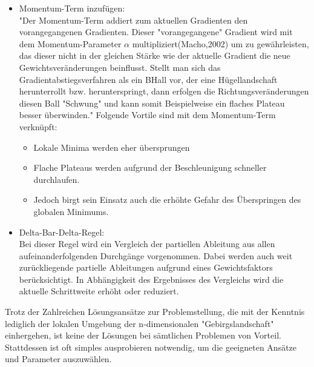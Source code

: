 \begin{itemize}
  \item Momentum-Term inzufügen:\\
  "Der Momentum-Term addiert zum aktuellen Gradienten den vorangegangenen Gradienten. Dieser "vorangegangene" Gradient wird mit dem Momentum-Parameter $\alpha$ multipliziert(Macho,2002) um zu gewährleisten, das dieser nicht
  in der gleichen Stärke wie der aktuelle Gradient die neue Gewichtsveränderungen beinflusst. Stellt man sich das Gradientabstiegsverfahren als ein BHall vor, der eine Hügellandschaft herunterrollt
  bzw. herunterspringt, dann erfolgen die Richtungsveränderungen diesen Ball "Schwung" und kann somit Beispielweise ein flaches Plateau besser überwinden." Folgende Vortile sind mit dem Momentum-Term verknüpft:\\
  \begin{itemize}
  \item Lokale Minima werden eher übersprungen
  \item Flache Plateaus werden aufgrund der Beschleunigung schneller durchlaufen.
  \item Jedoch birgt sein Einsatz auch die erhöhte Gefahr des Überspringen des globalen Minimums.
  \end{itemize}
\end{itemize}
\begin{itemize}
  \item  Delta-Bar-Delta-Regel:\\
  Bei dieser Regel wird ein Vergleich der partiellen Ableitung aus allen aufeinanderfolgenden Durchgänge vorgenommen. Dabei werden auch weit zurückliegende partielle Ableitungen aufgrund eines Gewichtsfaktors 
  berücksichtigt. In Abhängigkeit des Ergebnisses des Vergleichs wird die aktuelle Schrittweite erhöht oder reduziert.\\
\end{itemize}
Trotz der Zahlreichen Lösungsansätze zur Problemstellung, die mit der Kenntnis lediglich der lokalen Umgebung der n-dimensionalen "Gebirgslandschaft" einhergehen, ist keine der Lösungen bei sämtlichen Problemen 
von Vorteil. Stattdessen ist oft simples ausprobieren notwendig, um die geeigneten Ansätze und Parameter auszuwählen\cite[Seite 48]{GR10}.



